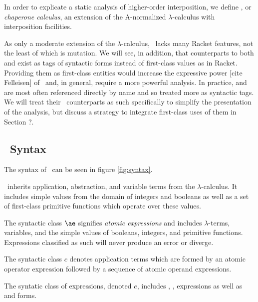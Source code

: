 \documentclass{sigplanconf}
\begin{document}
In order to explicate a static analysis of higher-order interposition, we define \chapcalc, or \emph{chaperone calculus}, an extension of the A-normalized $\lambda$-calculus with interposition facilities.

As only a moderate extension of the $\lambda$-calculus, \chapcalc\ lacks many Racket features, not the least of which is mutation.
We will see, in addition, that counterparts to both  and  exist as tags of syntactic forms instead of first-class values as in Racket.
Providing them as first-class entities would increase the expressive power [cite Felleisen] of \chapcalc\ and, in general, require a more powerful analysis.
In practice,  and  are most often referenced directly by name and so treated more as syntactic tags.
We will treat their \chapcalc\ counterparts as such specifically to simplify the presentation of the analysis, but discuss a strategy to integrate first-class uses of them in Section ?.

\subsection{\chapcalc\ Syntax}

The syntax of \chapcalc\ can be seen in figure \ref{fig:syntax}.

\chapcalc\ inherits application, abstraction, and variable terms from the $\lambda$-calculus.
It includes simple values from the domain of integers and booleans as well as a set of first-class primitive functions which operate over these values.

The syntactic class $\ae$ signifies \emph{atomic expressions} and includes $\lambda$-terms, variables, and the simple values of booleans, integers, and primitive functions. Expressions classified as such will never produce an error or diverge.

The syntactic class $c$ denotes application terms which are formed by an atomic operator expression followed by a sequence of atomic operand expressions.

The syntatic class of expressions, denoted $e$, includes , ,  expressions as well as  and  forms.
\end{document}
